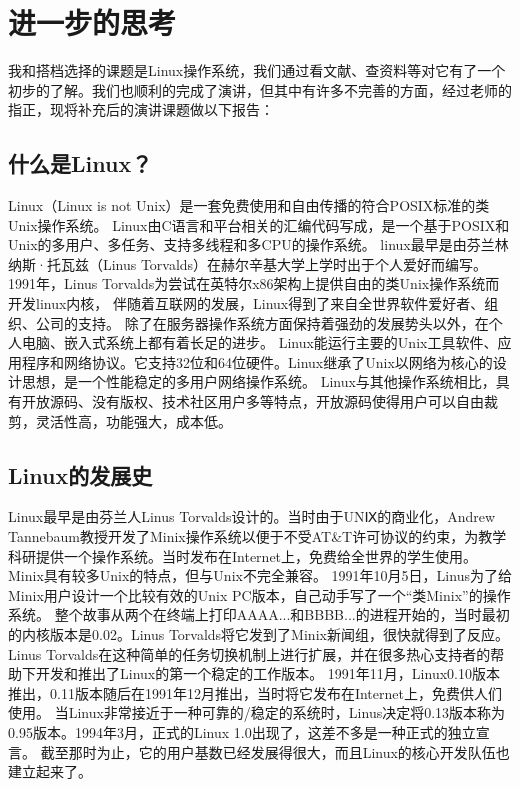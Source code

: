 \documentclass{article}
\begin{document}
\section{进一步的思考}
我和搭档选择的课题是Linux操作系统，我们通过看文献、查资料等对它有了一个初步的了解。我们也顺利的完成了演讲，但其中有许多不完善的方面，经过老师的指正，现将补充后的演讲课题做以下报告：\par
\subsection{什么是Linux？}\par
Linux（Linux is not Unix）是一套免费使用和自由传播的符合POSIX标准的类Unix操作系统。
Linux由C语言和平台相关的汇编代码写成，是一个基于POSIX和Unix的多用户、多任务、支持多线程和多CPU的操作系统。
linux最早是由芬兰林纳斯·托瓦兹（Linus Torvalds）在赫尔辛基大学上学时出于个人爱好而编写。
1991年，Linus Torvalds为尝试在英特尔x86架构上提供自由的类Unix操作系统而开发linux内核，
伴随着互联网的发展，Linux得到了来自全世界软件爱好者、组织、公司的支持。
除了在服务器操作系统方面保持着强劲的发展势头以外，在个人电脑、嵌入式系统上都有着长足的进步。
Linux能运行主要的Unix工具软件、应用程序和网络协议。它支持32位和64位硬件。Linux继承了Unix以网络为核心的设计思想，是一个性能稳定的多用户网络操作系统。
Linux与其他操作系统相比，具有开放源码、没有版权、技术社区用户多等特点，开放源码使得用户可以自由裁剪，灵活性高，功能强大，成本低。\par
\subsection{Linux的发展史}\par
Linux最早是由芬兰人Linus Torvalds设计的。当时由于UNⅨ的商业化，Andrew Tannebaum教授开发了Minix操作系统以便于不受AT\&T许可协议的约束，为教学科研提供一个操作系统。当时发布在Internet上，免费给全世界的学生使用。Minix具有较多Unix的特点，但与Unix不完全兼容。
1991年10月5日，Linus为了给Minix用户设计一个比较有效的Unix PC版本，自己动手写了一个“类Minix”的操作系统。
整个故事从两个在终端上打印AAAA...和BBBB...的进程开始的，当时最初的内核版本是0.02。Linus Torvalds将它发到了Minix新闻组，很快就得到了反应。
Linus Torvalds在这种简单的任务切换机制上进行扩展，并在很多热心支持者的帮助下开发和推出了Linux的第一个稳定的工作版本。
1991年11月，Linux0.10版本推出，0.11版本随后在1991年12月推出，当时将它发布在Internet上，免费供人们使用。
当Linux非常接近于一种可靠的/稳定的系统时，Linus决定将0.13版本称为0.95版本。1994年3月，正式的Linux 1.0出现了，这差不多是一种正式的独立宣言。
截至那时为止，它的用户基数已经发展得很大，而且Linux的核心开发队伍也建立起来了。\par
\end{document}
